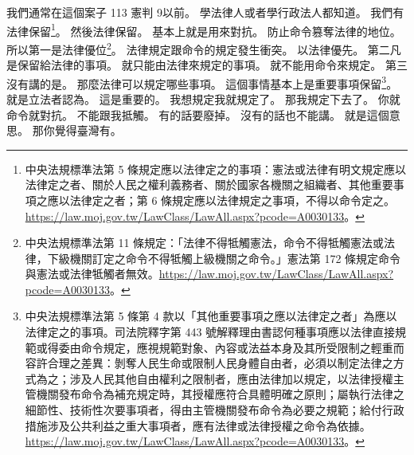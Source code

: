 \hypertarget{w01:cue:2110}{}我們通常在這個案子 113 憲判 9以前。
\hypertarget{w01:cue:2111}{}學法律人或者學行政法人都知道。
\hypertarget{w01:cue:2112}{}我們有法律保留\footnote{中央法規標準法第 5 條規定應以法律定之的事項：憲法或法律有明文規定應以法律定之者、關於人民之權利義務者、關於國家各機關之組織者、其他重要事項之應以法律定之者；第 6 條規定應以法律規定之事項，不得以命令定之。\url{https://law.moj.gov.tw/LawClass/LawAll.aspx?pcode=A0030133}。}。
\hypertarget{w01:cue:2113}{}然後法律保留。
\hypertarget{w01:cue:2114}{}基本上就是用來對抗。
\hypertarget{w01:cue:2115}{}防止命令篡奪法律的地位。
\hypertarget{w01:cue:2116}{}所以第一是法律優位\footnote{中央法規標準法第 11 條規定：「法律不得牴觸憲法，命令不得牴觸憲法或法律，下級機關訂定之命令不得牴觸上級機關之命令。」憲法第 172 條規定命令與憲法或法律牴觸者無效。\url{https://law.moj.gov.tw/LawClass/LawAll.aspx?pcode=A0030133}。}。
\hypertarget{w01:cue:2117}{}法律規定跟命令的規定發生衝突。
\hypertarget{w01:cue:2118}{}以法律優先。
\hypertarget{w01:cue:2119}{}第二凡是保留給法律的事項。
\hypertarget{w01:cue:2120}{}就只能由法律來規定的事項。
\hypertarget{w01:cue:2121}{}就不能用命令來規定。
\hypertarget{w01:cue:2122}{}第三沒有講的是。
\hypertarget{w01:cue:2123}{}那麼法律可以規定哪些事項。
\hypertarget{w01:cue:2124}{}這個事情基本上是重要事項保留\footnote{中央法規標準法第 5 條第 4 款以「其他重要事項之應以法律定之者」為應以法律定之的事項。司法院釋字第 443 號解釋理由書認何種事項應以法律直接規範或得委由命令規定，應視規範對象、內容或法益本身及其所受限制之輕重而容許合理之差異：剝奪人民生命或限制人民身體自由者，必須以制定法律之方式為之；涉及人民其他自由權利之限制者，應由法律加以規定，以法律授權主管機關發布命令為補充規定時，其授權應符合具體明確之原則；屬執行法律之細節性、技術性次要事項者，得由主管機關發布命令為必要之規範；給付行政措施涉及公共利益之重大事項者，應有法律或法律授權之命令為依據。\url{https://law.moj.gov.tw/LawClass/LawAll.aspx?pcode=A0030133}。}。
\hypertarget{w01:cue:2125}{}就是立法者認為。
\hypertarget{w01:cue:2126}{}這是重要的。
\hypertarget{w01:cue:2127}{}我想規定我就規定了。
\hypertarget{w01:cue:2128}{}那我規定下去了。
\hypertarget{w01:cue:2129}{}你就命令就對抗。
\hypertarget{w01:cue:2130}{}不能跟我抵觸。
\hypertarget{w01:cue:2131}{}有的話要廢掉。
\hypertarget{w01:cue:2132}{}沒有的話也不能講。
\hypertarget{w01:cue:2133}{}就是這個意思。
\hypertarget{w01:cue:2134}{}那你覺得臺灣有。

